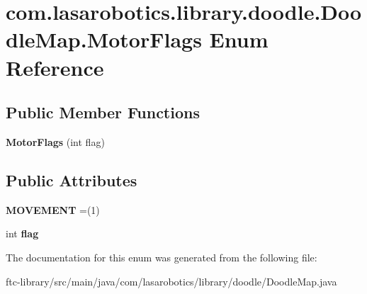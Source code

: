 \hypertarget{enumcom_1_1lasarobotics_1_1library_1_1doodle_1_1_doodle_map_1_1_motor_flags}{}\section{com.\+lasarobotics.\+library.\+doodle.\+Doodle\+Map.\+Motor\+Flags Enum Reference}
\label{enumcom_1_1lasarobotics_1_1library_1_1doodle_1_1_doodle_map_1_1_motor_flags}
\subsection*{Public Member Functions}
\begin{DoxyCompactItemize}
\item 
\hypertarget{enumcom_1_1lasarobotics_1_1library_1_1doodle_1_1_doodle_map_1_1_motor_flags_a243536cd556b4e7a3715ed5f9cade27b}{}{\bfseries Motor\+Flags} (int flag)\label{enumcom_1_1lasarobotics_1_1library_1_1doodle_1_1_doodle_map_1_1_motor_flags_a243536cd556b4e7a3715ed5f9cade27b}

\end{DoxyCompactItemize}
\subsection*{Public Attributes}
\begin{DoxyCompactItemize}
\item 
\hypertarget{enumcom_1_1lasarobotics_1_1library_1_1doodle_1_1_doodle_map_1_1_motor_flags_ae54de92decae212c1c8140b530b9642f}{}{\bfseries M\+O\+V\+E\+M\+E\+N\+T} =(1)\label{enumcom_1_1lasarobotics_1_1library_1_1doodle_1_1_doodle_map_1_1_motor_flags_ae54de92decae212c1c8140b530b9642f}

\item 
\hypertarget{enumcom_1_1lasarobotics_1_1library_1_1doodle_1_1_doodle_map_1_1_motor_flags_ae53082a81343fc33d7be5d99c06431f4}{}int {\bfseries flag}\label{enumcom_1_1lasarobotics_1_1library_1_1doodle_1_1_doodle_map_1_1_motor_flags_ae53082a81343fc33d7be5d99c06431f4}

\end{DoxyCompactItemize}


The documentation for this enum was generated from the following file\+:\begin{DoxyCompactItemize}
\item 
ftc-\/library/src/main/java/com/lasarobotics/library/doodle/Doodle\+Map.\+java\end{DoxyCompactItemize}
